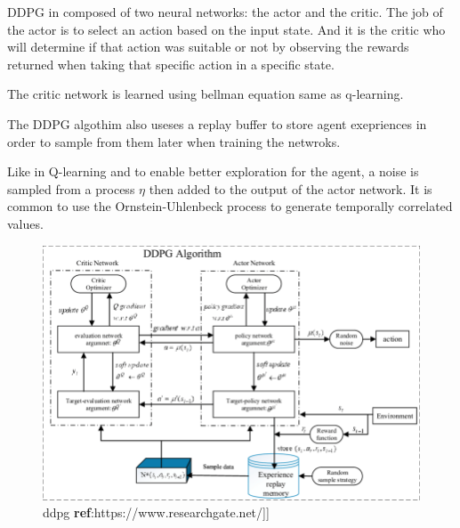 \documentclass[12pt]{extarticle}
\begin{document}
DDPG in  composed  of two neural networks: the actor and the critic. The job of the actor is to select an action based on the input state. And it is the critic who will determine if that action was suitable or not by observing the rewards  returned when taking that specific action in a specific state.

The critic network is  learned using bellman equation same as q-learning.

The DDPG algothim also useses a replay buffer to store agent exepriences
in order to sample from them later when training the netwroks.

Like in Q-learning and to enable better exploration for the agent, a noise 
is sampled from a process $\eta$  then added to the output of the actor network. It is common to use the Ornstein-Uhlenbeck process to generate temporally correlated values.\cite{lillicrap2015continuous}


 \begin{figure}[h] 
\centering
\includegraphics[scale=0.45]{ddpg}
\caption[ddpg]{ddpg \textbf{ref}:https://www.researchgate.net/]]}
\end{figure}
\end{document}
